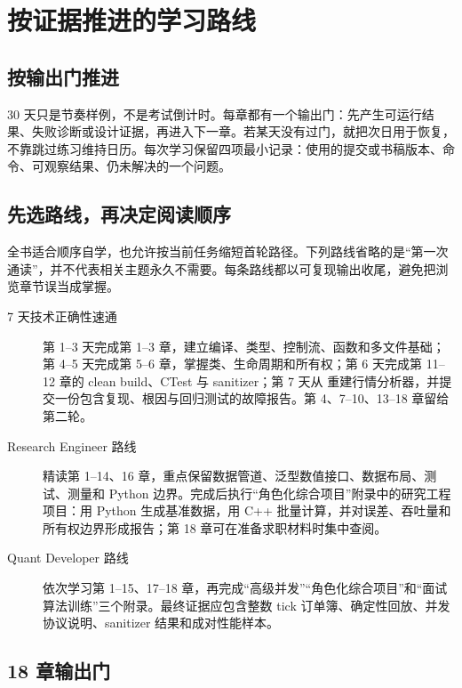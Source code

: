 \chapter{按证据推进的学习路线}

\section{按输出门推进}

30 天只是节奏样例，不是考试倒计时。每章都有一个输出门：先产生可运行结果、失败诊断或设计证据，再进入下一章。若某天没有过门，就把次日用于恢复，不靠跳过练习维持日历。每次学习保留四项最小记录：使用的提交或书稿版本、命令、可观察结果、仍未解决的一个问题。

\section{先选路线，再决定阅读顺序}

全书适合顺序自学，也允许按当前任务缩短首轮路径。下列路线省略的是“第一次通读”，并不代表相关主题永久不需要。每条路线都以可复现输出收尾，避免把浏览章节误当成掌握。

\begin{description}
  \item[7 天技术正确性速通] 第 1--3 天完成第 1--3 章，建立编译、类型、控制流、函数和多文件基础；第 4--5 天完成第 5--6 章，掌握类、生命周期和所有权；第 6 天完成第 11--12 章的 clean build、CTest 与 sanitizer；第 7 天从  重建行情分析器，并提交一份包含复现、根因与回归测试的故障报告。第 4、7--10、13--18 章留给第二轮。
  \item[Research Engineer 路线] 精读第 1--14、16 章，重点保留数据管道、泛型数值接口、数据布局、测试、测量和 Python 边界。完成后执行“角色化综合项目”附录中的研究工程项目：用 Python 生成基准数据，用 C++ 批量计算，并对误差、吞吐量和所有权边界形成报告；第 18 章可在准备求职材料时集中查阅。
  \item[Quant Developer 路线] 依次学习第 1--15、17--18 章，再完成“高级并发”“角色化综合项目”和“面试算法训练”三个附录。最终证据应包含整数 tick 订单簿、确定性回放、并发协议说明、sanitizer 结果和成对性能样本。
\end{description}

\section{18 章输出门}

